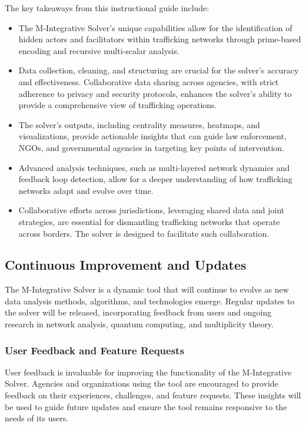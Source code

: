 \documentclass[%
 preprint, linenumbers,
 amsmath,amssymb,
 aps, physrev,
]{revtex4-2}
\begin{document}
The key takeaways from this instructional guide include:
\begin{itemize}
    \item The M-Integrative Solver's unique capabilities allow for the identification of hidden actors and facilitators within trafficking networks through prime-based encoding and recursive multi-scalar analysis.
    \item Data collection, cleaning, and structuring are crucial for the solver's accuracy and effectiveness. Collaborative data sharing across agencies, with strict adherence to privacy and security protocols, enhances the solver's ability to provide a comprehensive view of trafficking operations.
    \item The solver's outputs, including centrality measures, heatmaps, and visualizations, provide actionable insights that can guide law enforcement, NGOs, and governmental agencies in targeting key points of intervention.
    \item Advanced analysis techniques, such as multi-layered network dynamics and feedback loop detection, allow for a deeper understanding of how trafficking networks adapt and evolve over time.
    \item Collaborative efforts across jurisdictions, leveraging shared data and joint strategies, are essential for dismantling trafficking networks that operate across borders. The solver is designed to facilitate such collaboration.
\end{itemize}

\subsection{Continuous Improvement and Updates}

The M-Integrative Solver is a dynamic tool that will continue to evolve as new data analysis methods, algorithms, and technologies emerge. Regular updates to the solver will be released, incorporating feedback from users and ongoing research in network analysis, quantum computing, and multiplicity theory.

\subsubsection{User Feedback and Feature Requests}

User feedback is invaluable for improving the functionality of the M-Integrative Solver. Agencies and organizations using the tool are encouraged to provide feedback on their experiences, challenges, and feature requests. These insights will be used to guide future updates and ensure the tool remains responsive to the needs of its users.
\end{document}
